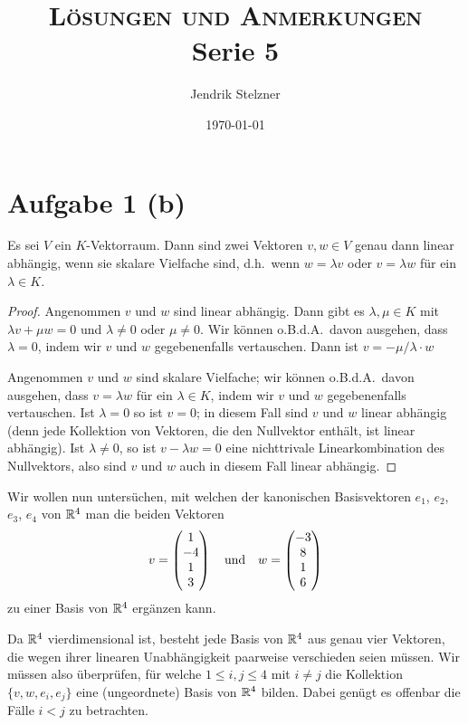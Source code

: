 \documentclass[a4paper,10pt]{article}
\title{\textsc{Lösungen und Anmerkungen} \\ Serie 5}
\author{Jendrik Stelzner}
\date{\today}
\begin{document}
\maketitle

\section*{Aufgabe 1 (b)}


\begin{lem}\label{lem: linear independence for two vectors}
 Es sei $V$ ein $K$-Vektorraum. Dann sind zwei Vektoren $v,w \in V$ genau dann linear abhängig, wenn sie skalare Vielfache sind, d.h.\ wenn $w = \lambda v$ oder $v = \lambda w$ für ein $\lambda \in K$.
\end{lem}
\begin{proof}
 Angenommen $v$ und $w$ sind linear abhängig. Dann gibt es $\lambda, \mu \in K$ mit $\lambda v + \mu w = 0$ und $\lambda \neq 0$ oder $\mu \neq 0$. Wir können o.B.d.A.\ davon ausgehen, dass $\lambda = 0$, indem wir $v$ und $w$ gegebenenfalls vertauschen. Dann ist $v = -\mu/\lambda \cdot w$
 
 Angenommen $v$ und $w$ sind skalare Vielfache; wir können o.B.d.A.\ davon ausgehen, dass $v = \lambda w$ für ein $\lambda \in K$, indem wir $v$ und $w$ gegebenenfalls vertauschen. Ist $\lambda = 0$ so ist $v = 0$; in diesem Fall sind $v$ und $w$ linear abhängig (denn jede Kollektion von Vektoren, die den Nullvektor enthält, ist linear abhängig). Ist $\lambda \neq 0$, so ist $v - \lambda w = 0$ eine nichttrivale Linearkombination des Nullvektors, also sind $v$ und $w$ auch in diesem Fall linear abhängig.
\end{proof}


Wir wollen nun untersüchen, mit welchen der kanonischen Basisvektoren $e_1$, $e_2$, $e_3$, $e_4$ von $\mathbb{R}^4$ man die beiden Vektoren
\[
 v = \begin{pmatrix}1 \\ -4 \\ 1 \\ 3\end{pmatrix} \quad \text{und} \quad w = \begin{pmatrix}-3 \\ 8 \\ 1 \\ 6\end{pmatrix}
\]
zu einer Basis von $\mathbb{R}^4$ ergänzen kann.

Da $\mathbb{R}^4$ vierdimensional ist, besteht jede Basis von $\mathbb{R}^4$ aus genau vier Vektoren, die wegen ihrer linearen Unabhängigkeit paarweise verschieden seien müssen. Wir müssen also überprüfen, für welche $1 \leq i,j \leq 4$ mit $i \neq j$ die Kollektion $\{v,w,e_i,e_j\}$ eine (ungeordnete) Basis von $\mathbb{R}^4$ bilden. Dabei genügt es offenbar die Fälle $i < j$ zu betrachten.
\end{document}
